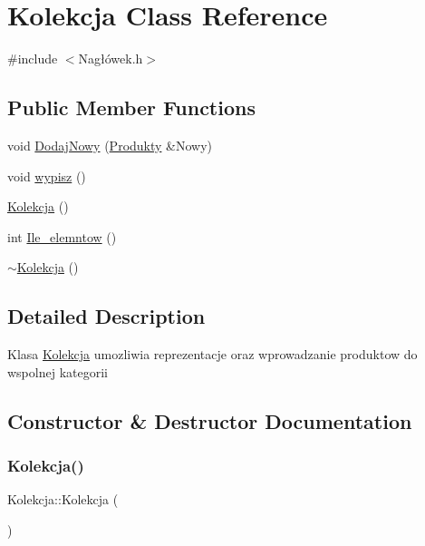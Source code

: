 \hypertarget{class_kolekcja}{}\section{Kolekcja Class Reference}
\label{class_kolekcja}


{\ttfamily \#include $<$Nagłówek.\+h$>$}

\subsection*{Public Member Functions}
\begin{DoxyCompactItemize}
\item 
void \mbox{\hyperlink{class_kolekcja_adc8b3d342db002a284da4cb28fea9493}{Dodaj\+Nowy}} (\mbox{\hyperlink{class_produkty}{Produkty}} \&Nowy)
\item 
void \mbox{\hyperlink{class_kolekcja_a61fa134a0db31a2141311dc2904d3dad}{wypisz}} ()
\item 
\mbox{\hyperlink{class_kolekcja_a2659548d6d46f0eb8a3256a5213ab38d}{Kolekcja}} ()
\item 
int \mbox{\hyperlink{class_kolekcja_a0da01243a4c06bf82c035054f9cb0954}{Ile\+\_\+elemntow}} ()
\item 
\mbox{\hyperlink{class_kolekcja_a220be4dda58af7e329be4e3ed51fa0c6}{$\sim$\+Kolekcja}} ()
\end{DoxyCompactItemize}


\subsection{Detailed Description}
Klasa \mbox{\hyperlink{class_kolekcja}{Kolekcja}} umozliwia reprezentacje oraz wprowadzanie produktow do wspolnej kategorii 

\subsection{Constructor \& Destructor Documentation}
\mbox{\label{class_kolekcja_a2659548d6d46f0eb8a3256a5213ab38d}} 
\subsubsection{\texorpdfstring{Kolekcja()}{Kolekcja()}}
{\footnotesize\ttfamily Kolekcja\+::\+Kolekcja (\begin{DoxyParamCaption}{ }\end{DoxyParamCaption})\hspace{0.3cm}{\ttfamily [inline]}}

